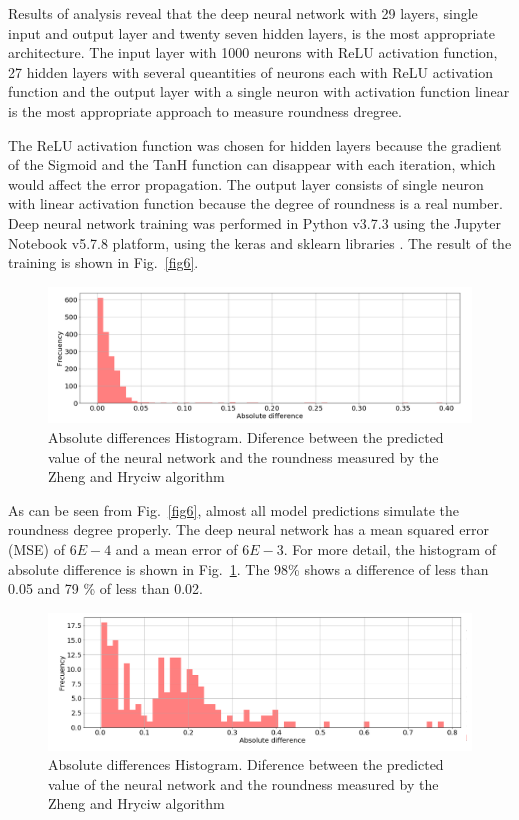 \documentclass[conference]{IEEEtran}
\begin{document}
Results of analysis reveal that the deep neural network with 29 layers, single input and output layer and twenty seven hidden layers, is the most appropriate architecture. The input layer with 1000 neurons with ReLU activation function, 27 hidden layers with several queantities of neurons each with ReLU activation function and the output layer with a single neuron with activation function linear is the most appropriate approach to measure roundness dregree. 

The ReLU activation function was chosen for hidden layers because the gradient of the Sigmoid and the TanH function can disappear with each iteration, which would affect the error propagation. The output layer consists of single neuron with linear activation function because the degree of roundness is a real number. Deep neural network training was performed in Python v3.7.3 using the Jupyter Notebook v5.7.8 platform, using the keras and sklearn libraries \cite{b13}. The result of the training is shown in Fig.~\ref{fig6}.

\begin{figure}[htbp]
	\centerline{\includegraphics[scale=0.2]{fig7.png}}
	\caption{Absolute differences Histogram. Diference between the predicted value of the neural network and the roundness measured by the Zheng and Hryciw algorithm}
	\label{fig7}
\end{figure}


As can be seen from Fig.~\ref{fig6}, almost all model predictions simulate the roundness degree properly. The deep neural network has a mean squared error (MSE) of 6$E-4$ and a mean error of 6$E-3$. For more detail, the histogram of absolute difference is shown in Fig.~\ref{fig7}. The 98\% shows a difference of less than 0.05 and 79 \% of less than 0.02.

\begin{figure}[htbp]
	\centerline{\includegraphics[scale=0.2]{fig8.png}}
	\caption{Absolute differences Histogram. Diference between the predicted value of the neural network and the roundness measured by the Zheng and Hryciw algorithm}
	\label{fig8}
\end{figure}
\end{document}
